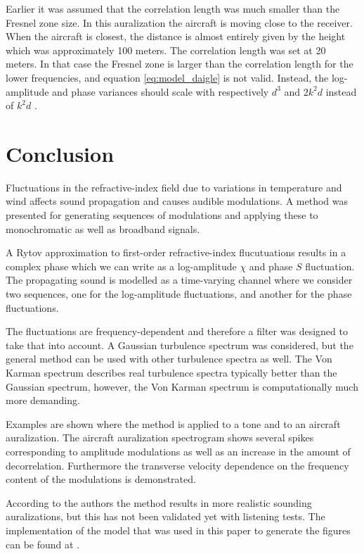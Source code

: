 Earlier it was assumed that the correlation length was much smaller than the Fresnel zone size.
In this auralization the aircraft is moving close to the receiver. When the aircraft is closest, the distance is almost entirely given by the height which was approximately 100 meters.
The correlation length was set at 20 meters. In that case the Fresnel zone is larger than the correlation length for the lower frequencies, and equation \eqref{eq:model_daigle} is not valid.
Instead, the log-amplitude and phase variances should scale with respectively $d^3$ and $2k^2 d$ instead of $k^2 d$ \cite{Ishimaru1997}.

\section{Conclusion}
Fluctuations in the refractive-index field due to variations in temperature and
wind affects sound propagation and causes audible modulations. A method was
presented for generating sequences of modulations and applying these to
monochromatic as well as broadband signals.

A Rytov approximation to first-order refractive-index flucutuations results in a complex
phase which we can write as a log-amplitude $\chi$ and phase $S$ fluctuation.
The propagating sound is modelled as a time-varying channel where we consider
two sequences, one for the log-amplitude fluctuations, and another for the phase
fluctuations.

The fluctuations are frequency-dependent and therefore a filter was designed to take that into account.
A Gaussian turbulence spectrum was considered, but the general method can be
used with other turbulence spectra as well. The Von Karman spectrum describes
real turbulence spectra typically better than the Gaussian spectrum, however,
the Von Karman spectrum is computationally much more demanding.

Examples are shown where the method is applied to a tone and to an aircraft
auralization. The aircraft auralization spectrogram shows several spikes
corresponding to amplitude modulations as well as an increase in the amount of
decorrelation. Furthermore the transverse velocity dependence on the frequency
content of the modulations is demonstrated.

According to the authors the method results in more realistic sounding
auralizations, but this has not been validated yet with listening tests. The
implementation of the model that was used in this paper to generate the figures
can be found at \cite{Rietdijk2016}.
